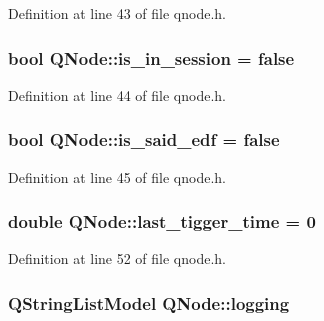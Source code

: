 Definition at line 43 of file qnode.\+h.

\subsubsection[{\texorpdfstring{is\+\_\+in\+\_\+session}{is_in_session}}]{\setlength{\rightskip}{0pt plus 5cm}bool Q\+Node\+::is\+\_\+in\+\_\+session = false}\hypertarget{class_q_node_a6ace2d0aa89adecfe699b3f1c3ce0b0f}{}\label{class_q_node_a6ace2d0aa89adecfe699b3f1c3ce0b0f}


Definition at line 44 of file qnode.\+h.

\subsubsection[{\texorpdfstring{is\+\_\+said\+\_\+edf}{is_said_edf}}]{\setlength{\rightskip}{0pt plus 5cm}bool Q\+Node\+::is\+\_\+said\+\_\+edf = false}\hypertarget{class_q_node_a9db73b60d8ffd6ac1e64ab5620f2db49}{}\label{class_q_node_a9db73b60d8ffd6ac1e64ab5620f2db49}


Definition at line 45 of file qnode.\+h.

\subsubsection[{\texorpdfstring{last\+\_\+tigger\+\_\+time}{last_tigger_time}}]{\setlength{\rightskip}{0pt plus 5cm}double Q\+Node\+::last\+\_\+tigger\+\_\+time = 0}\hypertarget{class_q_node_a932e8eb11684f38ae2fb3f23639b7c70}{}\label{class_q_node_a932e8eb11684f38ae2fb3f23639b7c70}


Definition at line 52 of file qnode.\+h.

\subsubsection[{\texorpdfstring{logging}{logging}}]{\setlength{\rightskip}{0pt plus 5cm}Q\+String\+List\+Model Q\+Node\+::logging\hspace{0.3cm}{\ttfamily [protected]}}\hypertarget{class_q_node_aff2207dadd447d4c2554df19b6f7ce48}{}\label{class_q_node_aff2207dadd447d4c2554df19b6f7ce48}



